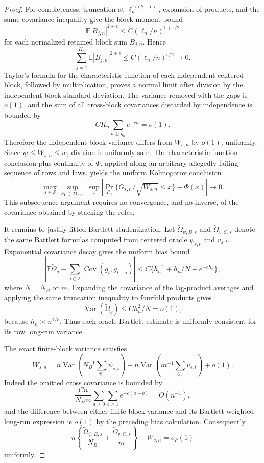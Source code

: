 \documentclass{article}
\begin{document}
\begin{proof}
For completeness, truncation at \(\ell_n^{1/(2+\epsilon)}\), expansion of products, and the same covariance inequality give the block moment bound
\[
 \mathbb E|B_{j,n}|^{2+\epsilon}\leq
 C(\ell_n/n)^{1+\epsilon/2}
\]
for each normalized retained block sum \(B_{j,n}\).  Hence
\[
 \sum_{j=1}^{K_n}\mathbb E|B_{j,n}|^{2+\epsilon}
 \leq C(\ell_n/n)^{\epsilon/2}\to0.
\]
Taylor's formula for the characteristic function of each independent centered block, followed by multiplication, proves a normal limit after division by the independent-block standard deviation.  The variance removed with the gaps is \(o(1)\), and the sum of all cross-block covariances discarded by independence is bounded by
\[
 C K_n\sum_{h\geq g_n}e^{-ch}=o(1).
\]
Therefore the independent-block variance differs from \(W_{s,n}\) by \(o(1)\), uniformly.  Since \(\underline w\leq W_{s,n}\leq\overline w\), division is uniformly safe.  The characteristic-function conclusion plus continuity of \(\Phi\), applied along an arbitrary allegedly failing sequence of rows and laws, yields the uniform Kolmogorov conclusion
\[
 \max_{s\in\mathcal S}\sup_{P_\bullet\in\mathcal M_{\mathrm{stab}}}
 \sup_x\left|\Pr_{P_n}\{G_{s,n}/\sqrt{W_{s,n}}\leq x\}-\Phi(x)\right|\to0.
\]
This subsequence argument requires no convergence, and no inverse, of the covariance obtained by stacking the roles.

It remains to justify fitted Bartlett studentization.  Let \(\widetilde\Omega_{\psi,B,s}\) and \(\widetilde\Omega_{v,C,s}\) denote the same Bartlett formulas computed from centered oracle \(\psi_{s,t}\) and \(v_{s,t}\).  Exponential covariance decay gives the uniform bias bound
\[
 \left|\mathbb E\widetilde\Omega_{g}-\sum_{j\in\mathbb Z}\operatorname{Cov}(g_t,g_{t-j})\right|
 \leq C\{h_n^{-1}+h_n/N+e^{-ch_n}\},
\]
where \(N=N_B\) or \(m\).  Expanding the covariance of the lag-product averages and applying the same truncation inequality to fourfold products gives
\[
 \operatorname{Var}(\widetilde\Omega_g)\leq C h_n^2/N=o(1),
\]
because \(h_n\asymp n^{1/5}\).  Thus each oracle Bartlett estimate is uniformly consistent for its row long-run variance.

The exact finite-block variance satisfies
\[
 W_{s,n}=n\operatorname{Var}\left(N_B^{-1}\sum_{\mathcal B_n}\psi_{s,t}\right)
 +n\operatorname{Var}\left(m^{-1}\sum_{\mathcal C_n}v_{s,t}\right)+o(1).
\]
Indeed the omitted cross covariance is bounded by
\[
 \frac{Cn}{N_Bm}\sum_{a\geq0}\sum_{b\geq1}e^{-c(a+b)}=O(n^{-1}),
\]
and the difference between either finite-block variance and its Bartlett-weighted long-run expression is \(o(1)\) by the preceding bias calculation.  Consequently
\[
 n\left\{\frac{\widetilde\Omega_{\psi,B,s}}{N_B}
 +\frac{\widetilde\Omega_{v,C,s}}m\right\}-W_{s,n}=o_P(1)
\]
uniformly.


\end{proof}
\end{document}
